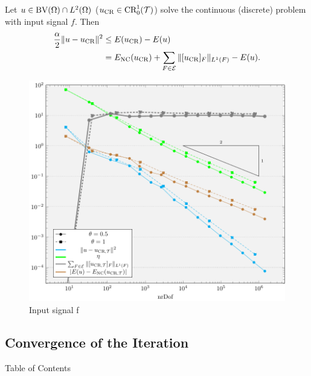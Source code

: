 \begin{frame}
  \begin{block}{ }
    Let $u\in\textup{BV}(\Omega)\cap L^2(\Omega)$ ($u_\textup{CR}\in\textup{CR}^1_0(\mathcal{T})$) solve the
    continuous (discrete) problem with input signal $f$.
    Then
    \begin{align*}
      \frac{\alpha}{2}\Vert u-u_\textup{CR}\Vert^2
      &\leq
      E(u_\textup{CR})-E(u)\\
     &=
      E_\textup{NC}(u_\textup{CR})+\sum_{F\in\mathcal{E}}\Vert[u_\textup{CR}]_F\Vert_{L^1(F)}-E(u).
    \end{align*}
  \end{block}

  \pause
  \begin{figure}[!ht]
    \centering
    \includegraphics[width=0.5\linewidth]
        {pictures/experiments/refIndGlebConvergence/f01/convergenceEtaErrorSquGleb.pdf}
        \caption*{Input signal f}
  \end{figure}
\end{frame}

\subsection{Convergence of the Iteration} 
\begin{frame}[noframenumbering]{Table of Contents}
\end{frame}

